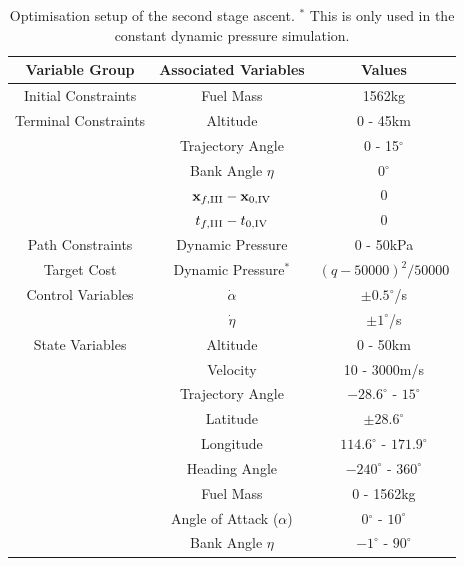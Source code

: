 \begin{table}[ht]
	\centering
	\begin{tabular}{|c|c|c|}
		\hline \textbf{Variable Group}  & \textbf{Associated Variables} & \textbf{Values}\\
		\hline Initial Constraints  & Fuel Mass & 1562kg\\ 
		\hline Terminal Constraints & Altitude & 0 - 45km\\ & Trajectory Angle& 0 - 15$^\circ$\\  & Bank Angle $\eta$& 0$^\circ$\\  & $\textbf{x}_{f,\textrm{\rom{3}}} - \textbf{x}_{0,\textrm{\rom{4}}}$ & 0\\ & $t_{f,\textrm{\rom{3}}} - t_{0,\textrm{\rom{4}}}$ & 0\\
		\hline Path Constraints & Dynamic Pressure& 0 - 50kPa\\ 
		\hline Target Cost & Dynamic Pressure$^*$ & $(q-50000)^2/50000$\\ 
		\hline Control Variables & $\dot{\alpha}$ &  $\pm0.5^\circ$/s\\  & $\dot{\eta}$ &  $\pm1^\circ$/s\\ 
		\hline State Variables & Altitude & 0 - 50km\\ & Velocity& 10 - 3000m/s\\ & Trajectory Angle& $-28.6^\circ$ - $15^\circ$\\   & Latitude&$\pm28.6^\circ$ \\  & Longitude& $114.6^\circ$ - $171.9^\circ$\\   & Heading Angle& $-240^\circ$ - $360^\circ$ \\  & Fuel Mass& 0 - 1562kg \\  & Angle of Attack ($\alpha$)&  0$^\circ$ - $10^\circ$ \\  & Bank Angle $\eta$& $-1^\circ$ - $90^\circ$ \\  
		\hline 
	\end{tabular} 
	\caption{Optimisation setup of the second stage ascent. $^*$ This is only used in the constant dynamic pressure simulation.}
	\label{tab:SPARTANascentsetup}
\end{table}

